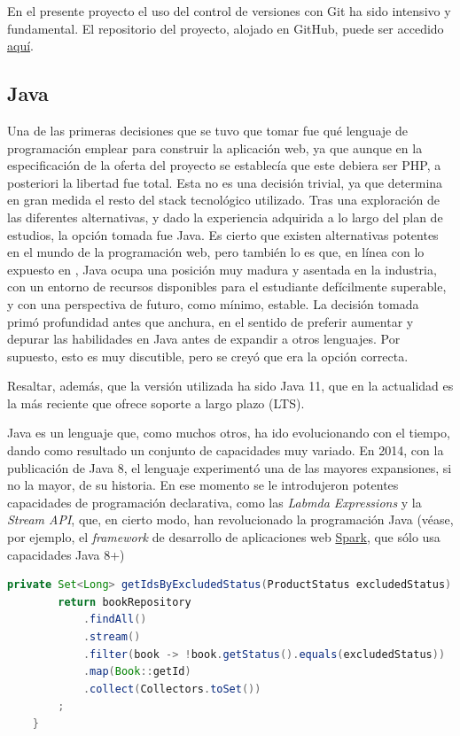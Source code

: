 \documentclass[a4paper,12pt,twoside,openright]{report}
\begin{document}
    En el presente proyecto el uso del control de versiones con Git ha sido intensivo y fundamental. El repositorio del proyecto, alojado en GitHub, puede ser accedido \href{https://github.com/misrraimsp/firstmarket}{aquí}.
    
    \subsection{Java}
    Una de las primeras decisiones que se tuvo que tomar fue qué lenguaje de programación emplear para construir la aplicación web, ya que aunque en la especificación de la oferta del proyecto se establecía que este debiera ser PHP, a posteriori la libertad fue total. Esta no es una decisión trivial, ya que determina en gran medida el resto del stack tecnológico utilizado. Tras una exploración de las diferentes alternativas, y dado la experiencia adquirida a lo largo del plan de estudios, la opción tomada fue Java. Es cierto que existen alternativas potentes en el mundo de la programación web, pero también lo es que, en línea con lo expuesto en \cite{Lopez2020}, Java ocupa una posición muy madura y asentada en la industria, con un entorno de recursos disponibles para el estudiante defícilmente superable, y con una perspectiva de futuro, como mínimo, estable. La decisión tomada primó profundidad antes que anchura, en el sentido de preferir aumentar y depurar las habilidades en Java antes de expandir a otros lenguajes. Por supuesto, esto es muy discutible, pero se creyó que era la opción correcta.
    
    Resaltar, además, que la versión utilizada ha sido Java 11, que en la actualidad es la más reciente que ofrece soporte a largo plazo (LTS).
    
    Java es un lenguaje que, como muchos otros, ha ido evolucionando con el tiempo, dando como resultado un conjunto de capacidades muy variado. En 2014, con la publicación de Java 8, el lenguaje experimentó una de las mayores expansiones, si no la mayor, de su historia. En ese momento se le introdujeron potentes capacidades de programación declarativa, como las \emph{Labmda Expressions} y la \emph{Stream API}, que, en cierto modo, han revolucionado la programación Java (véase, por ejemplo, el \emph{framework} de desarrollo de aplicaciones web \href{http://sparkjava.com/}{Spark}, que sólo usa capacidades Java 8+)
    \\
    
    \begin{lstlisting}[language=Java,caption=Programación declarativa con Java,label=list:java_declarative]
    private Set<Long> getIdsByExcludedStatus(ProductStatus excludedStatus) {
	    return bookRepository
		    .findAll()
		    .stream()
		    .filter(book -> !book.getStatus().equals(excludedStatus))
		    .map(Book::getId)
		    .collect(Collectors.toSet())
	    ;
    }
    \end{lstlisting}
    
\end{document}
